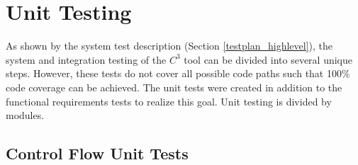 \documentclass[12pt, titlepage]{article}
\newcommand{\prognameAbbrv}{$C^{3}$}
\begin{document}
\newpage				
				
\section{Unit Testing}
		
As shown by the system test description (Section \ref{testplan_highlevel}), the 
system and integration testing of the \prognameAbbrv{} tool can be divided into 
several unique steps. However, these tests do not cover all possible code paths 
such that 100\% code coverage can be achieved. The unit tests were created in 
addition to the functional requirements tests to realize this goal. Unit 
testing is divided by modules.

\subsection{Control Flow Unit Tests}
\end{document}
